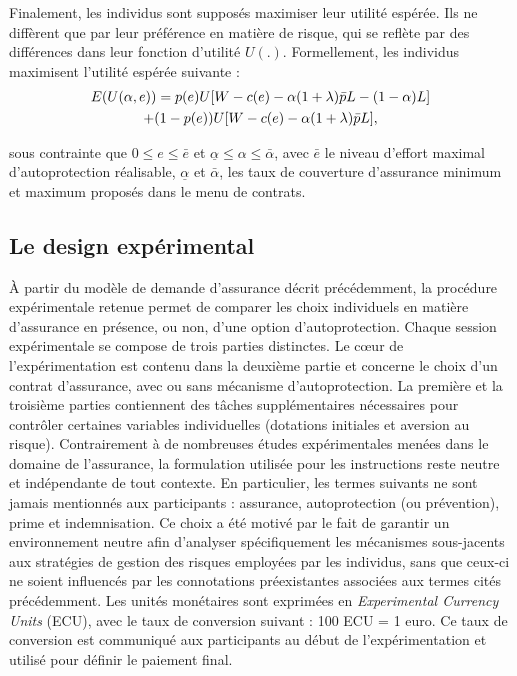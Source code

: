\begin{Article}
\begin{refsection}[Mouminoux]
Finalement, les individus sont supposés maximiser leur utilité espérée. Ils ne diffèrent que par leur préférence en matière de risque, qui se reflète par des différences dans leur fonction d'utilité $U(.)$. Formellement, les individus maximisent l'utilité espérée suivante :
\begin{gather}
E(U(\alpha,e)) = p(e)U[W - c(e) -\alpha(1+\lambda)\bar{p}L - (1 - \alpha)L] \notag \\+ (1 - p(e))U[W - c(e) - \alpha(1 + \lambda)\bar{p}L],
\end{gather}

\noindent sous contrainte que $0 \le e \le \bar{e}$ et $\underline \alpha \le \alpha \le \bar \alpha$, avec $\bar{e}$ le niveau d'effort maximal d'autoprotection réalisable, $\underline \alpha$ et $\bar \alpha$, les taux de couverture d'assurance minimum et maximum proposés dans le menu de contrats.


\subsection{Le design expérimental}

À partir du modèle de demande d'assurance décrit précédemment, la procédure expérimentale retenue permet de comparer les choix individuels en matière d'assurance en présence, ou non, d'une option d'autoprotection. Chaque session expérimentale se compose de trois parties distinctes. Le c\oe ur de l'expérimentation est contenu dans la deuxième partie et concerne le choix d'un contrat d'assurance, avec ou sans mécanisme d'autoprotection. La première et la troisième parties contiennent des tâches supplémentaires nécessaires pour contrôler certaines variables individuelles (dotations initiales et aversion au risque). Contrairement à de nombreuses études expérimentales menées dans le domaine de l'assurance, la formulation utilisée pour les instructions reste neutre et indépendante de tout contexte. En particulier, les termes suivants ne sont jamais mentionnés aux participants : assurance, autoprotection (ou prévention), prime et indemnisation. Ce choix a été motivé par le fait de garantir un environnement neutre afin d'analyser spécifiquement les mécanismes sous-jacents aux stratégies de gestion des risques employées par les individus, sans que ceux-ci ne soient influencés par les connotations préexistantes associées aux termes cités précédemment. Les unités monétaires sont exprimées en \textit{Experimental Currency Units} (ECU), avec le taux de conversion suivant : 100 ECU = 1 euro. Ce taux de conversion est communiqué aux participants au début de l'expérimentation et utilisé pour définir le paiement final.


\end{refsection}
\end{Article}
